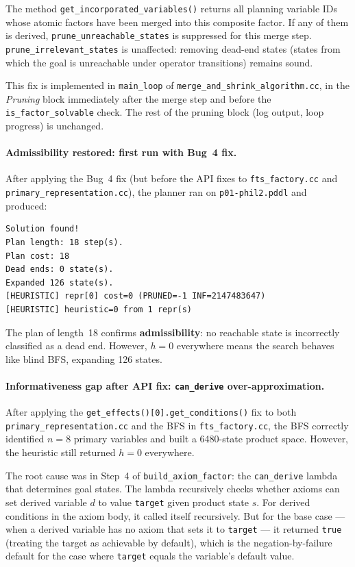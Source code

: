 \documentclass[11pt,a4paper]{article}
\begin{document}
The method \texttt{get\_incorporated\_variables()} returns all planning variable
IDs whose atomic factors have been merged into this composite factor.  If any
of them is derived, \texttt{prune\_unreachable\_states} is suppressed for this
merge step.  \texttt{prune\_irrelevant\_states} is unaffected: removing
dead-end states (states from which the goal is unreachable under operator
transitions) remains sound.

This fix is implemented in \texttt{main\_loop} of
\texttt{merge\_and\_shrink\_algorithm.cc}, in the \emph{Pruning} block
immediately after the merge step and before the \texttt{is\_factor\_solvable}
check.  The rest of the pruning block (log output, loop progress) is
unchanged.

\paragraph{Admissibility restored: first run with Bug~4 fix.}

After applying the Bug~4 fix (but before the API fixes to \texttt{fts\_factory.cc}
and \texttt{primary\_representation.cc}), the planner ran on
\texttt{p01-phil2.pddl} and produced:

\begin{lstlisting}
Solution found!
Plan length: 18 step(s).
Plan cost: 18
Dead ends: 0 state(s).
Expanded 126 state(s).
[HEURISTIC] repr[0] cost=0 (PRUNED=-1 INF=2147483647)
[HEURISTIC] heuristic=0 from 1 repr(s)
\end{lstlisting}

The plan of length~18 confirms \textbf{admissibility}: no reachable state is
incorrectly classified as a dead end.  However, $h = 0$ everywhere means the
search behaves like blind BFS, expanding 126 states.

\paragraph{Informativeness gap after API fix: \texttt{can\_derive} over-approximation.}

After applying the \texttt{get\_effects()[0].get\_conditions()} fix to both
\texttt{primary\_representation.cc} and the BFS in \texttt{fts\_factory.cc},
the BFS correctly identified $n = 8$ primary variables and built a 6480-state
product space.  However, the heuristic still returned $h = 0$ everywhere.

The root cause was in Step~4 of \texttt{build\_axiom\_factor}: the
\texttt{can\_derive} lambda that determines goal states.  The lambda recursively
checks whether axioms can set derived variable $d$ to value \texttt{target}
given product state $s$.  For derived conditions in the axiom body, it called
itself recursively.  But for the base case — when a derived variable has no
axiom that sets it to \texttt{target} — it returned \texttt{true} (treating the
target as achievable by default), which is the negation-by-failure default for
the case where \texttt{target} equals the variable's default value.
\end{document}
